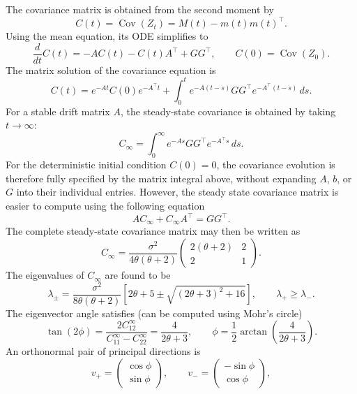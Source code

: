 \documentclass[11pt]{article}
\begin{document}
The covariance matrix is obtained from the second moment by
\begin{equation}
    C(t)=\operatorname{Cov}(Z_t)=M(t)-m(t)m(t)^\top.
\end{equation}
Using the mean equation, its ODE simplifies to
\begin{equation}
    \frac{d}{dt}C(t)=-A C(t)-C(t)A^\top+GG^\top,
    \qquad C(0)=\operatorname{Cov}(Z_0).
\end{equation}
The matrix solution of the covariance equation is
\begin{equation}
    C(t)=e^{-At}C(0)e^{-A^\top t}
    +\int_0^t e^{-A(t-s)}GG^\top e^{-A^\top(t-s)}\,ds.
\end{equation}
For a stable drift matrix $A$, the steady-state covariance is obtained by
taking $t\to\infty$:
\begin{equation}
    C_\infty=\int_0^\infty e^{-As}GG^\top e^{-A^\top s}\,ds.
\end{equation}
For the deterministic initial condition $C(0)=0$, the covariance evolution is
therefore fully specified by the matrix integral above, without expanding
$A$, $b$, or $G$ into their individual entries. However, the steady state covariance matrix is easier to compute using the following equation
\begin{equation}
    AC_\infty+C_\infty A^\top=GG^\top.
\end{equation}
The complete steady-state
covariance matrix may then be written as
\begin{equation}
    C_\infty
    =\frac{\sigma^2}{4\theta(\theta+2)}
    \begin{pmatrix}
        2(\theta+2) & 2 \\
        2           & 1
    \end{pmatrix}.
\end{equation}
The eigenvalues of $C_\infty$ are found to be
\begin{equation}
    \lambda_{\pm}
    =\frac{\sigma^2}{8\theta(\theta+2)}
    \left[2\theta+5
        \pm\sqrt{(2\theta+3)^2+16}\right],
    \qquad \lambda_+\geq\lambda_-.
\end{equation}
The eigenvector angle satisfies (can be computed using Mohr's circle)
\begin{equation}
    \tan(2\phi)
    =\frac{2C_{12}^\infty}{C_{11}^\infty-C_{22}^\infty}
    =\frac{4}{2\theta+3},
    \qquad
    \phi=\frac{1}{2}\arctan\left(\frac{4}{2\theta+3}\right).
\end{equation}
An orthonormal pair of principal directions is
\begin{equation}
    v_+=\begin{pmatrix}\cos\phi\\\sin\phi\end{pmatrix},
    \qquad
    v_- =\begin{pmatrix}-\sin\phi\\\cos\phi\end{pmatrix},
\end{equation}
\end{document}
